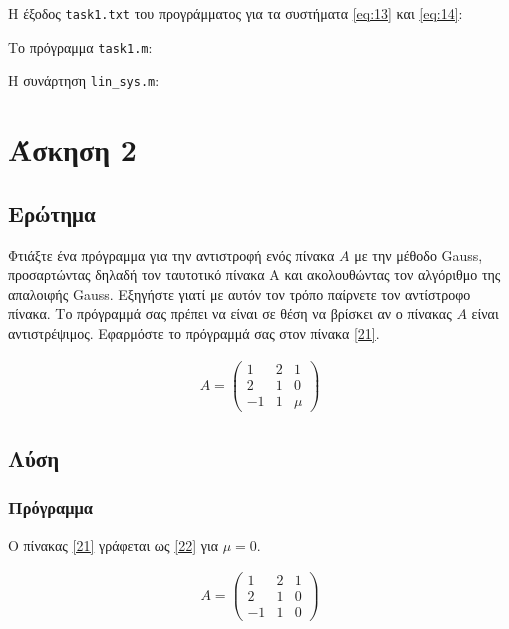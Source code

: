 \documentclass[12pt, fleqn, leqno]{extreport}
\begin{document}
Η έξοδος \lstinline[language={}]{task1.txt} του προγράμματος για τα συστήματα \eqref{eq:13} και \eqref{eq:14}:


\newpage
Το πρόγραμμα \lstinline[language={}]{task1.m}:


\newpage
Η συνάρτηση \lstinline[language={}]{lin_sys.m}:


\chapter{Άσκηση 2}
\section{Ερώτημα}

Φτιάξτε ένα πρόγραμμα για την αντιστροφή ενός πίνακα $A$ με την μέθοδο Gauss, προσαρτώντας δηλαδή τον ταυτοτικό πίνακα Α και ακολουθώντας τον αλγόριθμο της απαλοιφής Gauss. Εξηγήστε γιατί με αυτόν τον τρόπο παίρνετε τον αντίστροφο πίνακα. Το πρόγραμμά σας πρέπει να είναι σε θέση να βρίσκει αν ο πίνακας $A$ είναι αντιστρέψιμος. Εφαρμόστε το πρόγραμμά σας στον πίνακα \eqref{21}.

\begin{equation}
    \begin{aligned}
        A = \begin{pmatrix}
            1  & 2 & 1   \\
            2  & 1 & 0   \\
            -1 & 1 & \mu
        \end{pmatrix}\label{21}
    \end{aligned}
\end{equation}


\newpage
\section{Λύση}
\subsection{Πρόγραμμα}

Ο πίνακας \eqref{21} γράφεται ως \eqref{22} για $\mu = 0$.

\begin{equation}
    \begin{aligned}
        A = \begin{pmatrix}
            1  & 2 & 1 \\
            2  & 1 & 0 \\
            -1 & 1 & 0
        \end{pmatrix}\label{22}
    \end{aligned}
\end{equation}
\end{document}
